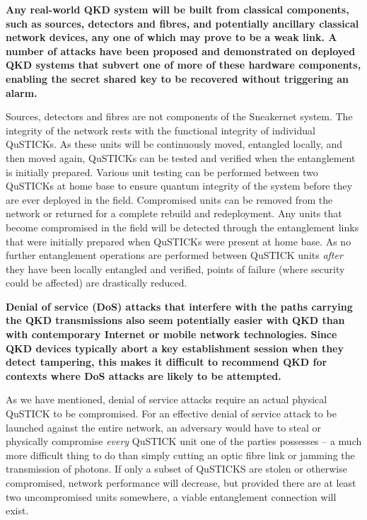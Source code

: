 \documentclass[twocolumn, aps, rmp, amsmath, amssymb, nofootinbib, superscriptaddress, longbibliography, floatfix, table-of-contents, eqsecnum]{revtex4-2}
\begin{document}
\textbf{Any real-world QKD system will be built from classical components, such as sources, detectors and fibres, and potentially ancillary classical network devices, any one of which may prove to be a weak link. A number of attacks have been proposed and demonstrated on deployed QKD systems that subvert one of more of these hardware components, enabling the secret shared key to be recovered without triggering an alarm.}

Sources, detectors and fibres are not components of the Sneakernet system. The integrity of the network rests with the functional integrity of individual QuSTICKs. As these units will be continuously moved, entangled locally, and then moved again, QuSTICKs can be tested and verified when the entanglement is initially prepared. Various unit testing can be performed between two QuSTICKs at home base to ensure quantum integrity of the system before they are ever deployed in the field. Compromised units can be removed from the network or returned for a complete rebuild and redeployment. Any units that become compromised in the field will be detected through the entanglement links that were initially prepared when QuSTICKs were present at home base. As no further entanglement operations are performed between QuSTICK units \textit{after} they have been locally entangled and verified, points of failure (where security could be affected) are drastically reduced. 

\textbf{Denial of service (DoS) attacks that interfere with the paths carrying the QKD transmissions also seem potentially easier with QKD than with contemporary Internet or mobile network technologies. Since QKD devices typically abort a key establishment session when they detect tampering, this makes it difficult to recommend QKD for contexts where DoS attacks are likely to be attempted.}

As we have mentioned, denial of service attacks require an actual physical QuSTICK to be compromised. For an effective denial of service attack to be launched against the entire network, an adversary would have to steal or physically compromise \textit{every} QuSTICK unit one of the parties possesses -- a much more difficult thing to do than simply cutting an optic fibre link or jamming the transmission of photons. If only a subset of QuSTICKS are stolen or otherwise compromised, network performance will decrease, but provided there are at least two uncompromised units somewhere, a viable entanglement connection will exist. 
\end{document}
